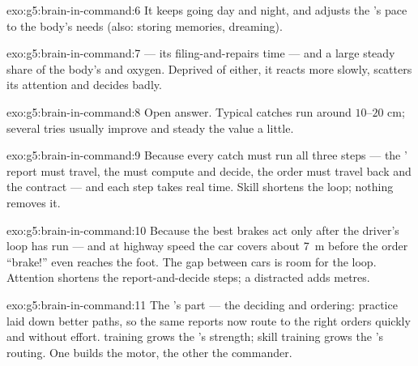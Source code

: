 \begin{solution}{exo:g5:brain-in-command:6}
It keeps  going day and night, and adjusts the
's pace to the body's needs (also: storing memories,
dreaming).
\end{solution}

\begin{solution}{exo:g5:brain-in-command:7}
 --- its filing-and-repairs time --- and a large steady
share of the body's  and oxygen. Deprived of either, it
reacts more slowly, scatters its attention and decides badly.
\end{solution}

\begin{solution}{exo:g5:brain-in-command:8}
Open answer. Typical catches run around $10$--$20$ cm;
several tries usually improve and steady the value a little.
\end{solution}

\begin{solution}{exo:g5:brain-in-command:9}
Because every catch must run all three steps --- the '
report must travel, the  must compute and decide, the
order must travel back and the  contract --- and each
step takes real time. Skill shortens the loop; nothing
removes it.
\end{solution}

\begin{solution}{exo:g5:brain-in-command:10}
Because the best brakes act only after the driver's loop has
run --- and at highway speed the car covers about \qty{7}{m}
before the order ``brake!'' even reaches the foot. The gap
between cars is room for the loop. Attention shortens the
report-and-decide steps; a distracted  adds metres.
\end{solution}

\begin{solution}{exo:g5:brain-in-command:11}
The 's part --- the deciding and ordering: practice laid
down better paths, so the same reports now route to the right
orders quickly and without effort.  training grows the
's strength; skill training grows the 's routing.
One builds the motor, the other the commander.
\end{solution}
